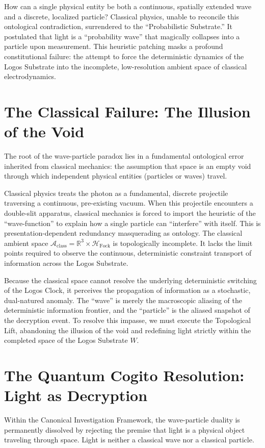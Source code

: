\documentclass[12pt,twoside]{extbook}
\theoremstyle{definition}
\theoremstyle{remark}
\begin{document}
How can a single physical entity be both a continuous, spatially extended wave and a discrete, localized particle? Classical physics, unable to reconcile this ontological contradiction, surrendered to the ``Probabilistic Substrate.'' It postulated that light is a ``probability wave'' that magically collapses into a particle upon measurement. This heuristic patching masks a profound constitutional failure: the attempt to force the deterministic dynamics of the Logos Substrate into the incomplete, low-resolution ambient space of classical electrodynamics.

\section{The Classical Failure: The Illusion of the Void}
The root of the wave-particle paradox lies in a fundamental ontological error inherited from classical mechanics: the assumption that space is an empty void through which independent physical entities (particles or waves) travel. 

Classical physics treats the photon as a fundamental, discrete projectile traversing a continuous, pre-existing vacuum. When this projectile encounters a double-slit apparatus, classical mechanics is forced to import the heuristic of the ``wave-function'' to explain how a single particle can ``interfere'' with itself. This is presentation-dependent redundancy masquerading as ontology. The classical ambient space $\mathcal{A}_{\text{class}} = \mathbb{R}^3 \times \mathcal{H}_{\text{Fock}}$ is topologically incomplete. It lacks the limit points required to observe the continuous, deterministic constraint transport of information across the Logos Substrate.

Because the classical space cannot resolve the underlying deterministic switching of the Logos Clock, it perceives the propagation of information as a stochastic, dual-natured anomaly. The ``wave'' is merely the macroscopic aliasing of the deterministic information frontier, and the ``particle'' is the aliased snapshot of the decryption event. To resolve this impasse, we must execute the Topological Lift, abandoning the illusion of the void and redefining light strictly within the completed space of the Logos Substrate $W$.

\section{The Quantum Cogito Resolution: Light as Decryption}
Within the Canonical Investigation Framework, the wave-particle duality is permanently dissolved by rejecting the premise that light is a physical object traveling through space. Light is neither a classical wave nor a classical particle. 
\end{document}

